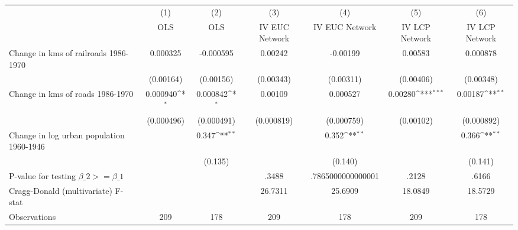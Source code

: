 {
\def\sym#1{\ifmmode^{#1}\else\(^{#1}\)\fi}
\begin{tabular}{l*{6}{c}}
\hline\hline
                &\multicolumn{1}{c}{(1)}&\multicolumn{1}{c}{(2)}&\multicolumn{1}{c}{(3)}&\multicolumn{1}{c}{(4)}&\multicolumn{1}{c}{(5)}&\multicolumn{1}{c}{(6)}\\
                &\multicolumn{1}{c}{OLS}&\multicolumn{1}{c}{OLS}&\multicolumn{1}{c}{IV EUC Network}&\multicolumn{1}{c}{IV EUC Network}&\multicolumn{1}{c}{IV LCP Network}&\multicolumn{1}{c}{IV LCP Network}\\
\hline
Change in kms of railroads 1986-1970& 0.000325         &-0.000595         &  0.00242         & -0.00199         &  0.00583         & 0.000878         \\
                &(0.00164)         &(0.00156)         &(0.00343)         &(0.00311)         &(0.00406)         &(0.00348)         \\
[1em]
Change in kms of roads 1986-1970& 0.000940\sym{*}  & 0.000842\sym{*}  &  0.00109         & 0.000527         &  0.00280\sym{***}&  0.00187\sym{**} \\
                &(0.000496)         &(0.000491)         &(0.000819)         &(0.000759)         &(0.00102)         &(0.000892)         \\
[1em]
Change in log urban population 1960-1946&                  &    0.347\sym{**} &                  &    0.352\sym{**} &                  &    0.366\sym{**} \\
                &                  &  (0.135)         &                  &  (0.140)         &                  &  (0.141)         \\
\hline
P-value for testing $\beta\_{2} >= \beta\_{1}$&                  &                  &    .3488         &.7865000000000001         &    .2128         &    .6166         \\
Cragg-Donald (multivariate) F-stat&                  &                  &  26.7311         &  25.6909         &  18.0849         &  18.5729         \\
Observations    &      209         &      178         &      209         &      178         &      209         &      178         \\
\hline\hline
\end{tabular}
}
